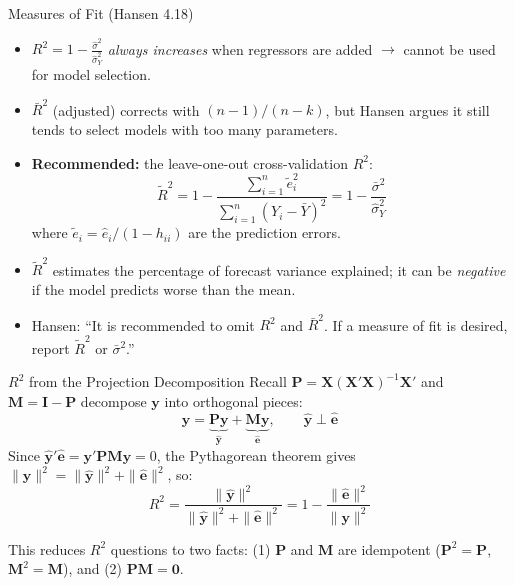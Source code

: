 \documentclass[aspectratio=169, handout, t]{beamer}
\numberwithin{equation}{section}
\begin{document}
\begin{frame}{Measures of Fit (Hansen 4.18)}
\begin{itemize}
\item $R^2=1-\frac{\hat{\sigma}^2}{\hat{\sigma}_Y^2}$ \emph{always increases} when regressors are added $\rightarrow$ cannot be used for model selection. \pause
\item $\bar{R}^2$ (adjusted) corrects with $(n-1)/(n-k)$, but Hansen argues it still tends to select models with too many parameters. \pause
\item \textbf{Recommended:} the leave-one-out cross-validation $R^2$:
$$\tilde{R}^2=1-\frac{\sum_{i=1}^n\tilde{e}_i^2}{\sum_{i=1}^n(Y_i-\bar{Y})^2}=1-\frac{\bar{\sigma}^2}{\hat{\sigma}_Y^2}$$
where $\tilde{e}_i=\hat{e}_i/(1-h_{ii})$ are the prediction errors. \pause
\item $\tilde{R}^2$ estimates the percentage of forecast variance explained; it can be \emph{negative} if the model predicts worse than the mean. \pause
\item Hansen: ``It is recommended to omit $R^2$ and $\bar{R}^2$.  If a measure of fit is desired, report $\tilde{R}^2$ or $\bar{\sigma}^2$.''
\end{itemize}
\end{frame}


\begin{frame}{$R^2$ from the Projection Decomposition}
Recall $\bm{P}=\bm{X}(\bm{X'X})^{-1}\bm{X}'$ and $\bm{M}=\bm{I}-\bm{P}$ decompose $\bm{y}$ into orthogonal pieces:
$$\bm{y}=\underbrace{\bm{P}\bm{y}}_{\hat{\bm{y}}}+\underbrace{\bm{M}\bm{y}}_{\hat{\bm{e}}}, \qquad \hat{\bm{y}}\perp\hat{\bm{e}}$$
\pause
Since $\hat{\bm{y}}'\hat{\bm{e}}=\bm{y}'\bm{PM}\bm{y}=0$, the Pythagorean theorem gives
$\|\bm{y}\|^2=\|\hat{\bm{y}}\|^2+\|\hat{\bm{e}}\|^2$, so:
$$R^2=\frac{\|\hat{\bm{y}}\|^2}{\|\hat{\bm{y}}\|^2+\|\hat{\bm{e}}\|^2}=1-\frac{\|\hat{\bm{e}}\|^2}{\|\bm{y}\|^2}$$
\pause
\begin{tcolorbox}[colback=blue!5, colframe=blue!50]
This reduces $R^2$ questions to two facts: (1) $\bm{P}$ and $\bm{M}$ are idempotent ($\bm{P}^2=\bm{P}$, $\bm{M}^2=\bm{M}$), and (2) $\bm{PM}=\bm{0}$.
\end{tcolorbox}
\end{frame}
\end{document}
